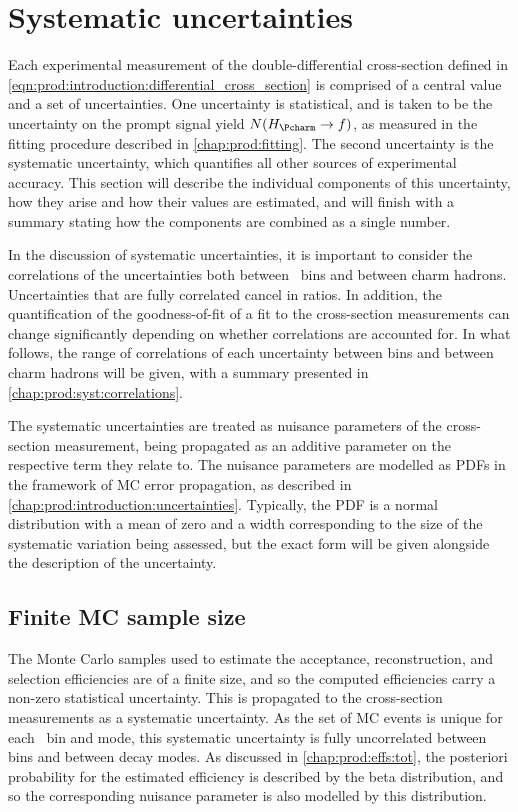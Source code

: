 \chapter{Systematic uncertainties}
\label{chap:prod:syst}

Each experimental measurement of the double-differential cross-section defined 
in \cref{eqn:prod:introduction:differential_cross_section} is comprised of a 
central value and a set of uncertainties.
One uncertainty is statistical, and is taken to be the uncertainty on the 
prompt signal yield $N(\HcTof)$, as measured in the fitting procedure described 
in \cref{chap:prod:fitting}.
The second uncertainty is the systematic uncertainty, which quantifies all 
other sources of experimental accuracy.
This section will describe the individual components of this uncertainty, how 
they arise and how their values are estimated, and will finish with a summary 
stating how the components are combined as a single number.

In the discussion of systematic uncertainties, it is important to consider the 
correlations of the uncertainties both between \pTy\ bins and between charm 
hadrons.
Uncertainties that are fully correlated cancel in ratios.
In addition, the quantification of the goodness-of-fit of a fit to the 
cross-section measurements can change significantly depending on whether 
correlations are accounted for.
In what follows, the range of correlations of each uncertainty between bins and 
between charm hadrons will be given, with a summary presented in 
\cref{chap:prod:syst:correlations}.

The systematic uncertainties are treated as nuisance parameters of the 
cross-section measurement, being propagated as an additive parameter on the 
respective term they relate to.
The nuisance parameters are modelled as \aclp{PDF} in the framework of \acl{MC} 
error propagation, as described in \cref{chap:prod:introduction:uncertainties}.
Typically, the \ac{PDF} is a normal distribution with a mean of zero and a 
width corresponding to the size of the systematic variation being assessed, but 
the exact form will be given alongside the description of the uncertainty.

\section{Finite \acl{MC} sample size}
\label{chap:prod::syst:mcstat}

The Monte Carlo samples used to estimate the acceptance, reconstruction, and 
selection efficiencies are of a finite size, and so the computed efficiencies 
carry a non-zero statistical uncertainty.
This is propagated to the cross-section measurements as a systematic 
uncertainty.
As the set of \ac{MC} events is unique for each \pTy\ bin and mode, this 
systematic uncertainty is fully uncorrelated between bins and between decay 
modes.
As discussed in \cref{chap:prod:effs:tot}, the posteriori probability 
for the estimated efficiency is described by the beta distribution, and so the 
corresponding nuisance parameter is also modelled by this distribution.

